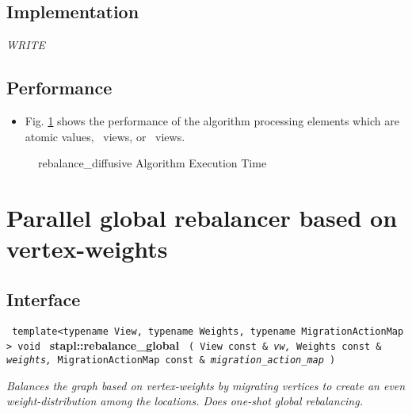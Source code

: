 \subsection{Implementation} \label{sec-rebal-diff-alg-impl}

\textit{WRITE}

\subsection{Performance} \label{sec-rebal-diff-alg-perf}

\begin{itemize}
\item
Fig. \ref{fig:rebal-diff-alg-exec-exper}
shows the performance of the algorithm processing
elements which are atomic values, \stl\ views, or \stapl\ views.
\end{itemize}

\begin{figure}[p]
\caption{ rebalance\_diffusive Algorithm Execution Time}
\label{fig:rebal-diff-alg-exec-exper}
\end{figure}


\section{ Parallel global rebalancer based on vertex-weights}
\label{sec-rebal-glob-alg}

\subsection{Interface} \label{sec-rebal-glob-alg-inter}

\noindent
\texttt{%
template<typename View, typename Weights, typename MigrationActionMap >
\newline
void 
}
\newline
\textbf{stapl::rebalance\_global}%
\newline
\texttt{%
(
View const \&
\textit{vw,}%
Weights const \&
\textit{weights,}%
MigrationActionMap const \&
\textit{migration\_action\_map}%
)     
}
\vspace{0.4cm}

\textit{
Balances the graph based on vertex-weights by migrating vertices to create an even weight-distribution among the locations. Does one-shot global rebalancing.
}
\vspace{0.4cm}

